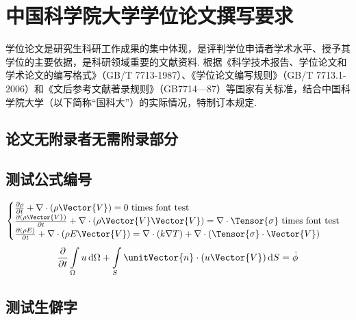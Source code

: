 \chapter{中国科学院大学学位论文撰写要求}

学位论文是研究生科研工作成果的集中体现，是评判学位申请者学术水平、授予其学位的主要依据，是科研领域重要的文献资料. 根据《科学技术报告、学位论文和学术论文的编写格式》（GB/T 7713-1987）、《学位论文编写规则》（GB/T 7713.1-2006）和《文后参考文献著录规则》（GB7714—87）等国家有关标准，结合中国科学院大学（以下简称“国科大”）的实际情况，特制订本规定. 

\section{论文无附录者无需附录部分}

\section{测试公式编号} \label{sec:testmath}

\begin{equation} \label{eq:appedns}
    \begin{cases}
        \frac{\partial \rho}{\partial t} + \nabla\cdot(\rho\Vector{V}) = 0 \ \mathrm{times\ font\ test}\\
        \frac{\partial (\rho\Vector{V})}{\partial t} + \nabla\cdot(\rho\Vector{V}\Vector{V}) = \nabla\cdot\Tensor{\sigma} \ \text{times font test}\\
        \frac{\partial (\rho E)}{\partial t} + \nabla\cdot(\rho E\Vector{V}) = \nabla\cdot(k\nabla T) + \nabla\cdot(\Tensor{\sigma}\cdot\Vector{V})
    \end{cases}
\end{equation}
\begin{equation}
    \frac{\partial }{\partial t}\int\limits_{\Omega} u \, \mathrm{d}\Omega + \int\limits_{S} \unitVector{n}\cdot(u\Vector{V}) \, \mathrm{d}S = \dot{\phi}
\end{equation}

\section{测试生僻字}

